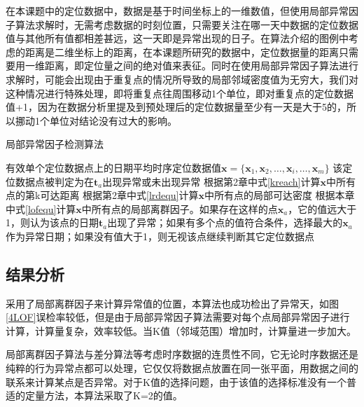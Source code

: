 \documentclass[a4paper,AutoFakeBold,oneside,12pt]{book}
\begin{document}
	在本课题中的定位数据中，数据是基于时间坐标上的一维数值，但使用局部异常因子算法求解时，无需考虑数据的时刻位置，只需要关注在哪一天中数据的定位数据值与其他所有值都相差甚远，这一天即是异常出现的日子。在算法介绍的图例中考虑的距离是二维坐标上的距离，在本课题所研究的数据中，定位数据量的距离只需要用一维距离，即定位量之间的绝对值来表征。同时在使用局部异常因子算法进行求解时，可能会出现由于重复点的情况所导致的局部邻域密度值为无穷大，我们对这种情况进行特殊处理，即将重复点往周围移动1个单位，即对重复点的定位数据值+1，因为在数据分析里提及到预处理后的定位数据量至少有一天是大于5的，所以挪动1个单位对结论没有过大的影响。

\begin{algorithm} 
\caption{局部异常因子检测算法} 
\label{a44}
\renewcommand{\algorithmicrequire}{\textbf{输入：}}
\renewcommand{\algorithmicensure}{\textbf{输出：}} 
\begin{algorithmic}[1] 
\Require 有效单个定位数据点上的日期平均时序定位数据值$\bm{x}=\{\bm{x}_1,\bm{x}_2,\ldots,\bm{x}_i,\ldots,\bm{x}_m\}$
\Ensure 该定位数据点被判定为在$\bm{t}_a$出现异常或未出现异常
\State  根据第2章中式\ref{kreach}计算$\bm{x}$中所有点的第k可达距离
\State  根据第2章中式\ref{lrdequ}计算$\bm{x}$中所有点的局部可达密度
\State 根据本章中式\ref{lofequ}计算$\bm{x}$中所有点的局部离群因子。如果存在这样的点$\bm{x}_a$，它的值远大于1，则认为该点的日期$\bm{t}_a$出现了异常；如果有多个点的值符合条件，选择最大的$\bm{x}_a$作为异常日期；如果没有值大于1，则无视该点继续判断其它定位数据点
\end{algorithmic}  
\end{algorithm}


\subsection{结果分析}
采用了局部离群因子来计算异常值的位置，本算法也成功检出了异常天，如图\ref{4LOF}误检率较低，但是由于局部异常因子算法需要对每个点局部异常因子进行计算，计算量复杂，效率较低。当K值（邻域范围）增加时，计算量进一步加大。


局部离群因子算法与差分算法等考虑时序数据的连贯性不同，它无论时序数据还是纯粹的行为异常点都可以处理，它仅仅将数据点放置在同一张平面，用数据之间的联系来计算某点是否异常。对于K值的选择问题，由于该值的选择标准没有一个普适的定量方法，本算法采取了K=2的值\cite{杨营辉2010基于密度的样本裁剪算法的改进及在}。
\end{document}
